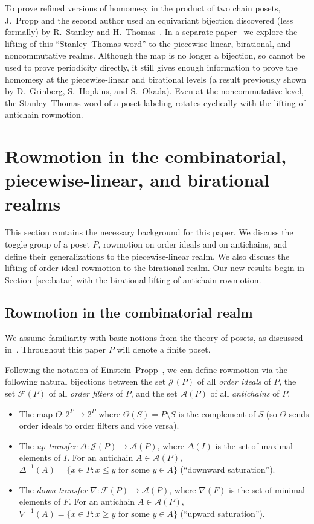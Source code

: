 \documentclass[ALCO,ThmDefs,Unicode,epreuves]{cedram}
\newcommand{\defn}[1]{\emph{#1}}
\newcommand{\ra}{\rightarrow}
\newcommand{\down}{\nabla}
\newcommand{\up}{\Delta}
\newcommand{\sm}{\setminus}
\newcommand{\cala}{\mathcal{A}}
\newcommand{\calf}{\mathcal{F}}
\newcommand{\calj}{\mathcal{J}}
\begin{document}
To prove refined versions of homomesy in the product of two chain posets, J.~Propp and the
second author used an equivariant bijection discovered (less formally) by R.~Stanley and
H.~Thomas~\cite[\S~7]{propproby}. 
In a separate paper~\cite{STword} we explore the lifting of this ``Stanley--Thomas word'' to the
piecewise-linear, birational, and noncommutative realms. Although the map is no longer a
bijection, so cannot be used to prove periodicity directly, it still gives enough
information to prove the homomesy at the piecewise-linear and birational levels (a result
previously shown by D.~Grinberg, S.~Hopkins, and S.~Okada). Even at the noncommutative
level, the Stanley--Thomas word of a poset labeling rotates cyclically with the lifting of
antichain rowmotion.


\section{Rowmotion in the combinatorial, piecewise-linear, and birational realms}\label{sec:jungle rollers}

This section contains the necessary background for this paper.
We discuss the toggle group of a poset $P$, rowmotion on order ideals and on antichains, and
define their
generalizations to the piecewise-linear realm. We also discuss the lifting of order-ideal
rowmotion to the birational realm. 
Our new results begin in Section~\ref{sec:batar} with the birational lifting of
antichain rowmotion.

\subsection{Rowmotion in the combinatorial realm}

We assume familiarity with basic notions from the theory of posets,
as discussed in~\cite[Ch.~3]{ec1ed2}.
Throughout this paper $P$ will denote a finite poset.

Following the notation of Einstein--Propp~\cite{einpropp}, we can define rowmotion via the
following natural bijections between the set $\calj(P)$ of all 
\emph{order ideals} of $P$, the set $\calf(P)$ of all \emph{order filters} of $P$, and the set $\cala(P)$ of
all \emph{antichains} of $P$. 
\begin{itemize}
\item The map $\Theta: 2^P \ra 2^P$ where $\Theta(S) = P\sm S$ is the complement of $S$ (so $\Theta$ sends order ideals to order filters and vice versa).
\item The \defn{up-transfer} $\up:\calj(P) \ra \cala(P)$, where $\up(I)$ is the set of maximal elements of $I$. For an antichain $A\in\cala(P)$,
$\up^{-1}(A)=\{x\in P: x\leq y \text{ for some } y\in A\}$ (``downward saturation'').
\item The \defn{down-transfer} $\down:\calf(P) \ra \cala(P)$, where $\down(F)$ is the set of minimal elements of $F$. For an antichain $A\in\cala(P)$,
$\down^{-1}(A)=\{x\in P: x\geq y \text{ for some } y\in A\}$ (``upward saturation'').
\end{itemize}
\end{document}
